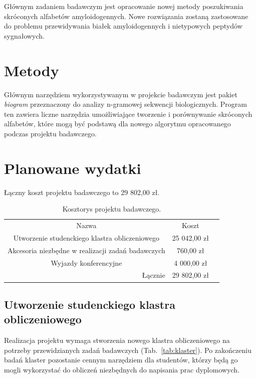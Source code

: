 \documentclass{article}
\begin{document}
Głównym zadaniem badawczym jest opracowanie nowej metody poszukiwania 
skróconych alfabetów amyloidogennych. Nowe rozwiązania zostaną zastosowane do 
problemu przewidywania białek amyloidogennych i nietypowych peptydów 
sygnałowych.

\section{Metody}

Głównym narzędziem wykorzystywanym w projekcie badawczym jest pakiet 
\textit{biogram} przeznaczony do analizy n-gramowej sekwencji biologicznych. 
Program ten zawiera liczne narzędzia umożliwiające tworzenie i porównywanie 
skróconych alfabetów, które mogą być podstawą dla nowego algorytmu opracowanego 
podczas projektu badawczego.


\section{Planowane wydatki}

Łączny koszt projektu badawczego to 29 802,00 zł.

\begin{table}[!htbp]
\centering
\caption*{Kosztorys projektu badawczego.}
\begin{tabular}{rrr}
\cline{1-2}
\multicolumn{1}{|c}{Nazwa}                                   & \multicolumn{1}{|c|}{Koszt}   &  \\ \cline{1-2}
\multicolumn{1}{|c}{Utworzenie studenckiego klastra obliczeniowego} & 
\multicolumn{1}{|c|}{25 042,00 zł} &  \\ \cline{1-2}
\multicolumn{1}{|c}{Akcesoria niezbędne w realizacji zadań badawczych}   & 
\multicolumn{1}{|c|}{760,00 zł} &  \\ \cline{1-2}
\multicolumn{1}{|c}{Wyjazdy konferencyjne}   & 
\multicolumn{1}{|c|}{4 000,00 zł} &  \\ \cline{1-2}
Łącznie    & 29 802,00 zł                    & 
\end{tabular}
\end{table}

\subsection{Utworzenie studenckiego klastra obliczeniowego}

Realizacja projektu wymaga stworzenia nowego klastra obliczeniowego na potrzeby 
przewidzianych zadań badawczych (Tab.~\ref{tab:klaster}). Po zakończeniu badań 
klaster pozostanie cennym narzędziem dla studentów, którzy będą go mogli 
wykorzystać do obliczeń niezbędnych do napisania prac dyplomowych.
\end{document}

